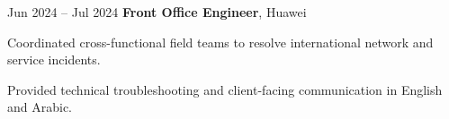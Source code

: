 \begin{twocolentry}{
        Jun 2024 – Jul 2024
    }
\textbf{Front Office Engineer}, Huawei\end{twocolentry}

\vspace{0.10 cm}
\begin{onecolentry}
    \begin{highlights}
        \item Coordinated cross-functional field teams to resolve international network and service incidents.
        \item Provided technical troubleshooting and client-facing communication in English and Arabic.
    \end{highlights}
\end{onecolentry}